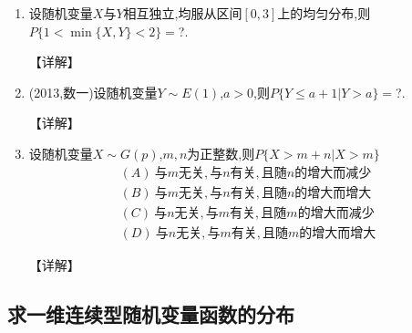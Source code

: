 \documentclass[12pt, a4paper, oneside, UTF8]{ctexbook}
\begin{document}
\begin{enumerate}[label=\arabic*.,start=6]
    \item  设随机变量$X$与$Y$相互独立,均服从区间$[0,3]$上的均匀分布,则$P\{1<\min\{X,Y\}<2\}=$?.
    
    \begin{solution}
    【详解】
    \end{solution}
    
    \item  (2013,数一)设随机变量$Y\sim E(1)$,$a>0$,则$P\{Y\leq a+1|Y>a\}=$?.
    
    \begin{solution}
    【详解】
    \end{solution}
    
    \item  设随机变量$X\sim G(p)$,$m,n$为正整数,则$P\{X>m+n|X>m\}$
    \begin{align*}
        (A)\ 与m无关,与n有关,且随n的增大而减少 \\
        (B)\ 与m无关,与n有关,且随n的增大而增大 \\
        (C)\ 与n无关,与m有关,且随m的增大而减少 \\
        (D)\ 与n无关,与m有关,且随m的增大而增大
    \end{align*}
    
    \begin{solution}
    【详解】
    \end{solution}
\end{enumerate}

\subsection{求一维连续型随机变量函数的分布}
\end{document}
